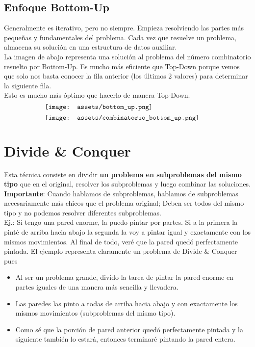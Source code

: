 \documentclass[10pt,a4paper]{article}
\begin{document}
\subsection*{Enfoque Bottom-Up}
Generalmente es iterativo, pero no siempre. Empieza resolviendo las partes más pequeñas y fundamentales del problema. Cada vez que resuelve un problema, almacena su solución en una estructura de datos auxiliar. \\
La imagen de abajo representa una solución al problema del número combinatorio resuelto por Bottom-Up. Es mucho más eficiente que Top-Down porque vemos que solo nos basta conocer la fila anterior (los últimos 2 valores) para determinar la siguiente fila. \\
Esto es mucho más óptimo que hacerlo de manera Top-Down.
\[\begin{minipage}[b]{0.7\textwidth}
    \texttt{[image: assets/bottom\_up.png]}
\end{minipage}\]
\[\begin{minipage}[b]{0.7\textwidth}
    \texttt{[image: assets/combinatorio\_bottom\_up.png]}
\end{minipage}\]
\section*{Divide \& Conquer}
Esta técnica consiste en dividir \textbf{un problema en subproblemas
 del mismo tipo} que en el original, resolver los subproblemas y luego combinar las soluciones. \\

\textbf{Importante}: Cuando hablamos de subproblemas, hablamos de subproblemas necesariamente más chicos que el problema original; Deben ser todos del mismo tipo y no podemos resolver diferentes subproblemas. \\

Ej.: Si tengo una pared enorme, la puedo pintar por partes. Si a la primera la pinté de arriba hacia abajo la segunda la voy a pintar igual y exactamente con los mismos movimientos. Al final de todo, veré que la pared quedó perfectamente pintada.
El ejemplo representa claramente un problema de Divide \& Conquer pues
\begin{itemize}
    \item Al ser un problema grande, divido la tarea de pintar la pared enorme en partes iguales de una manera más sencilla y llevadera.
    \item Las paredes las pinto a todas de arriba hacia abajo y con exactamente los mismos movimientos (subproblemas del mismo tipo).
    \item Como sé que la porción de pared anterior quedó perfectamente pintada y la siguiente también lo estará, entonces terminaré pintando la pared entera.
\end{itemize}
\end{document}
